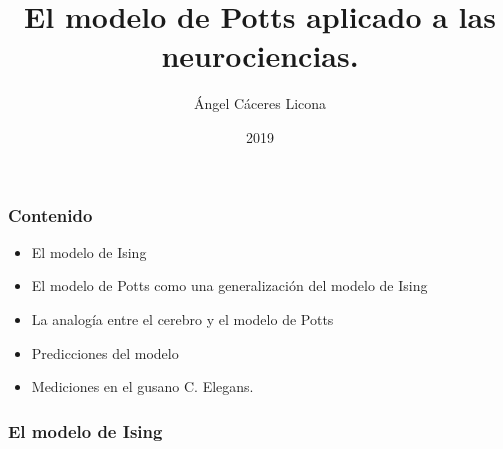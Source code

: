 \documentclass{beamer}
\title{El modelo de Potts aplicado a las neurociencias.}
\author{{Ángel Cáceres Licona}}
\institute{División de Ciencias Naturales e Ingeniería}
\date{2019}
\begin{document}
 
\frame{\titlepage}
 
\begin{frame}
\frametitle{Contenido}
\begin{itemize}
    \item El modelo de Ising
    \item El modelo de Potts como una generalización del modelo de Ising
    \item La analogía entre el cerebro y el modelo de Potts
    \item Predicciones del modelo
    \item Mediciones en el gusano C. Elegans.
  \end{itemize}
\end{frame}

\begin{frame}
\frametitle{El modelo de Ising}


\end{frame}
 
\end{document}
